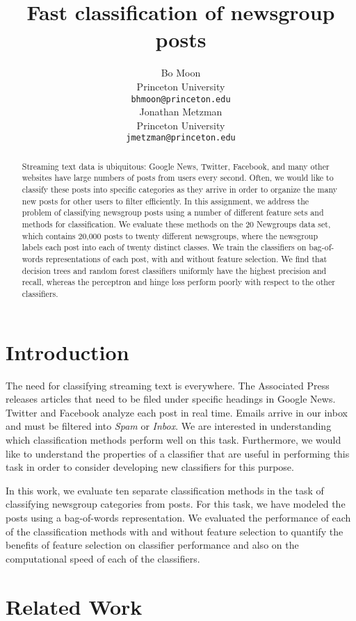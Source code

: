 \documentclass{article} %
\title{Fast classification of newsgroup posts}
\author{
Bo Moon\\
Princeton University\\
\texttt{bhmoon@princeton.edu} \\
\And
Jonathan Metzman\\
Princeton University \\
\texttt{jmetzman@princeton.edu} \\
}
\begin{document}
\maketitle

\begin{abstract}
Streaming text data is ubiquitous: Google News, Twitter, Facebook, and many other websites have large numbers of posts from users every second. Often, we would like to classify these posts into specific categories as they arrive in order to organize the many new posts for other users to filter efficiently. In this assignment, we address the problem of classifying newsgroup posts using a number of different feature sets and methods for classification. We evaluate these methods on the 20 Newgroups data set, which contains 20,000 posts to twenty different newsgroups, where the newsgroup labels each post into each of twenty distinct classes. We train the classifiers on bag-of-words representations of each post, with and without feature selection. We find that decision trees and random forest classifiers uniformly have the highest precision and recall, whereas the perceptron and hinge loss perform poorly with respect to the other classifiers.
\end{abstract}
\section{Introduction}

The need for classifying streaming text is everywhere. The Associated Press releases articles that need to be filed under specific headings in Google News. Twitter and Facebook analyze each post in real time. Emails arrive in our inbox and must be filtered into \emph{Spam} or \emph{Inbox}. We are interested in understanding which classification methods perform well on this task. Furthermore, we would like to understand the properties of a classifier that are useful in performing this task in order to consider developing new classifiers for this purpose.

In this work, we evaluate ten separate classification methods in the task of classifying newsgroup categories from posts. For this task, we have modeled the posts using a bag-of-words representation. We evaluated the performance of each of the classification methods with and without feature selection to quantify the benefits of feature selection on classifier performance and also on the computational speed of each of the classifiers.

\section{Related Work}
\end{document}
